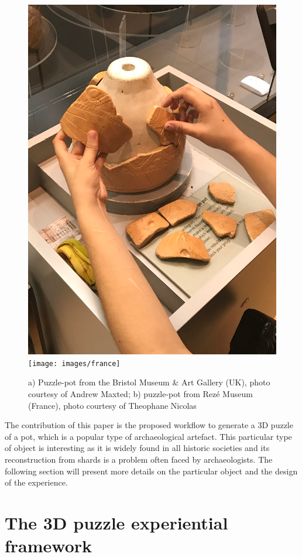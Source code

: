 \documentclass[acmlarge,screen,dvipsnames]{acmart}
\begin{document}

\begin{figure}[htb]
  \centering
  \includegraphics[width=0.45\linewidth]{images/uk}
    \texttt{[image: images/france]}
  \caption{\label{fig:puz}
    a) Puzzle-pot from the Bristol Museum \& Art Gallery (UK), photo courtesy of Andrew Maxted;
        b)  puzzle-pot from Rez\'e Museum (France), photo courtesy of Theophane Nicolas}
\end{figure}
  


The contribution of this paper is the proposed workflow to generate a
3D puzzle of a pot, which is a popular type of archaeological
artefact. This particular type of object is interesting as it is
widely found in all historic societies and its reconstruction from
shards is a problem often faced by archaeologists. The following
section will present more details on the particular object and the
design of the experience.

\section{The 3D puzzle experiential framework}
\label{requirements}
\end{document}
